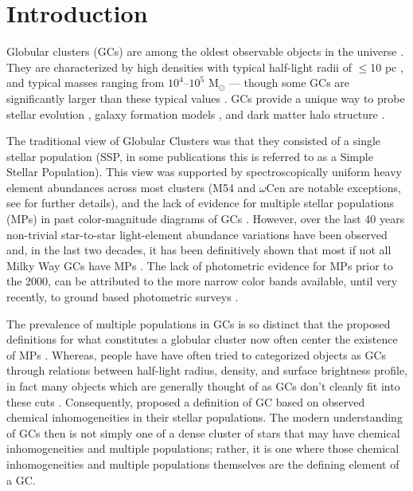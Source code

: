 \section{Introduction}\label{sec:Intro}
Globular clusters (GCs) are among the oldest observable objects in the universe
\citep{Pen11}. They are characterized by high densities with typical half-light
radii of $\le$10 pc \citep{Vanderburg2010}, and typical masses ranging from
$10^{4}$--$10^{5}$ M$_{\odot}$ \citep{Bro06} --- though some GCs are
significantly larger than these typical values \citep[e.g. $\omega$ Cen,
][]{Richer1991}. GCs provide a unique way to probe stellar evolution
\citep{Bau03}, galaxy formation models \citep{Boy18,Kra05}, and dark matter
halo structure \citep{Hud18}.

The traditional view of Globular Clusters was that they consisted of a single
stellar population (SSP, in some publications this is referred to as a Simple
Stellar Population). This view was supported by spectroscopically uniform heavy
element abundances \citep{Carretta2010, Bastian2018} across most clusters (M54
and $\omega$Cen are notable exceptions, see \citet{Marino2015} for further
details), and the lack of evidence for multiple stellar populations (MPs) in
past color-magnitude diagrams of GCs \citep[i.e.][]{Sandage1953, Alcaino1975}.
However, over the last 40 years non-trivial star-to-star light-element
abundance variations have been observed \citep[i.e.][]{Smith1987} and, in the
last two decades, it has been definitively shown that most if not all Milky Way
GCs have MPs \citep{Gratton2004, Gratton2012, Piotto2015}. The lack of
photometric evidence for MPs prior to the 2000, can be attributed to the more
narrow color bands available, until very recently, to ground based photometric
surveys \citep{Milone2017}.

The prevalence of multiple populations in GCs is so distinct that the proposed
definitions for what constitutes a globular cluster now often center the
existence of MPs \citep[e.g.][]{Carretta2010}. Whereas, people have have often
tried to categorized objects as GCs through relations between half-light
radius, density, and surface brightness profile, in fact many objects which are
generally thought of as GCs don't cleanly fit into these cuts
\citep{Peebles1968, Brown1991, Brown1995, Bekki2002}. Consequently,
\citet{Carretta2010} proposed a definition of GC based on observed chemical
inhomogeneities in their stellar populations. The modern understanding of GCs
then is not simply one of a dense cluster of stars that may have chemical
inhomogeneities and multiple populations; rather, it is one where those
chemical inhomogeneities and multiple populations themselves are the defining
element of a GC.

